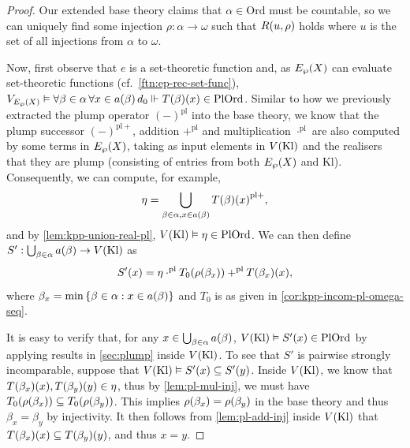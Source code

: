 \documentclass[12pt,openany]{book}
\theoremstyle{plain}
\theoremstyle{definition}
\newcommand\opA[1]{\mathop{\forall #1}}
\newcommand\Ord{\mathrm{Ord}}
\newcommand\PlOrd{\mathrm{PlOrd}}
\newcommand\Kl{\mathrm{Kl}}
\newcommand\pl{\mathrm{pl}}
\newcommand\pls{{\pl +}}
\begin{document}
\begin{proof}
  Our extended base theory claims that $\alpha \in \Ord$ must be countable, so we can uniquely find some injection $\rho : \alpha \rightarrow \omega$ such that $R\mleft(u, \rho\mright)$ holds where $u$ is the set of all injections from $\alpha$ to $\omega$.

  Now, first observe that $e$ is a set-theoretic function and, as $E_\wp\mleft(X\mright)$ can evaluate set-theoretic functions (cf.\ \autoref{ftn:ep-rec-set-func}), $V_{E_\wp\mleft(X\mright)} \vDash \opA{\beta \in \alpha} \opA{x \in a\mleft(\beta\mright)} d_0 \Vdash T\mleft(\beta\mright)\mleft(x\mright) \in \PlOrd$. Similar to how we previously extracted the plump operator $\left(-\right)^\pl$ into the base theory, we know that the plump successor $\left(-\right)^\pls$, addition $+^\pl$ and multiplication $\cdot^\pl$ are also computed by some terms in $E_\wp\mleft(X\mright)$, taking as input elements in $V\mleft(\Kl\mright)$ and the realisers that they are plump (consisting of entries from both $E_\wp\mleft(X\mright)$ and $\Kl$). Consequently, we can compute, for example,
  \[\eta = \bigcup_{\beta \in \alpha, x \in a\mleft(\beta\mright)} T\mleft(\beta\mright)\mleft(x\mright)^\pls,\]
  and by \autoref{lem:kpp-union-real-pl}, $V\mleft(\Kl\mright) \vDash \eta \in \PlOrd$. We can then define $S' : \bigcup_{\beta \in \alpha} a\mleft(\beta\mright) \rightarrow V\mleft(\Kl\mright)$ as
  \[S'\mleft(x\mright) = \eta \cdot^\pl T_0\mleft(\rho\mleft(\beta_x\mright)\mright) +^\pl T\mleft(\beta_x\mright)\mleft(x\mright),\]
  where $\beta_x = \min \left\{\beta \in \alpha : x \in a\mleft(\beta\mright)\right\}$ and $T_0$ is as given in \autoref{cor:kpp-incom-pl-omega-seq}.

  It is easy to verify that, for any $x \in \bigcup_{\beta \in \alpha} a\mleft(\beta\mright)$, $V\mleft(\Kl\mright) \vDash S'\mleft(x\mright) \in \PlOrd$ by applying results in \autoref{sec:plump} inside $V\mleft(\Kl\mright)$. To see that $S'$ is pairwise strongly incomparable, suppose that $V\mleft(\Kl\mright) \vDash S'\mleft(x\mright) \subseteq S'\mleft(y\mright)$. Inside $V\mleft(\Kl\mright)$, we know that $T\mleft(\beta_x\mright)\mleft(x\mright), T\mleft(\beta_y\mright)\mleft(y\mright) \in \eta$, thus by \autoref{lem:pl-mul-inj}, we must have $T_0\mleft(\rho\mleft(\beta_x\mright)\mright) \subseteq T_0\mleft(\rho\mleft(\beta_y\mright)\mright)$. This implies $\rho\mleft(\beta_x\mright) = \rho\mleft(\beta_y\mright)$ in the base theory and thus $\beta_x = \beta_y$ by injectivity. It then follows from \autoref{lem:pl-add-inj} inside $V\mleft(\Kl\mright)$ that $T\mleft(\beta_x\mright)\mleft(x\mright) \subseteq T\mleft(\beta_y\mright)\mleft(y\mright)$, and thus $x = y$.


\end{proof}
\end{document}
